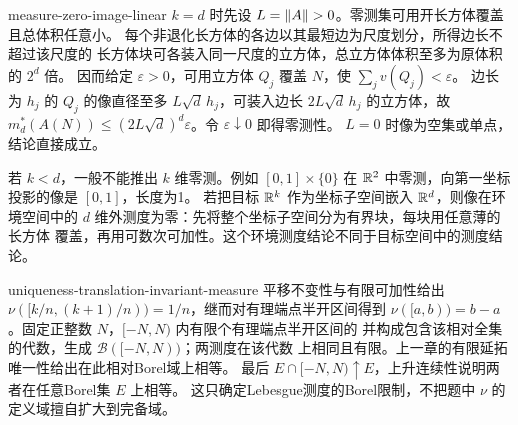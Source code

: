 \begin{solution}{measure-zero-image-linear}
$k=d$ 时先设 $L=\left\lVert A\right\rVert>0$。零测集可用开长方体覆盖且总体积任意小。
每个非退化长方体的各边以其最短边为尺度划分，所得边长不超过该尺度的
长方体块可各装入同一尺度的立方体，总立方体体积至多为原体积的 $2^d$ 倍。
因而给定 $\varepsilon>0$，可用立方体 $Q_j$ 覆盖 $N$，使
$\sum_jv(Q_j)<\varepsilon$。
边长为 $h_j$ 的 $Q_j$ 的像直径至多 $L\sqrt d\,h_j$，可装入边长
$2L\sqrt d\,h_j$ 的立方体，故
$m_d^*(A(N))\le(2L\sqrt d)^d\varepsilon$。令 $\varepsilon\downarrow0$ 即得零测性。
$L=0$ 时像为空集或单点，结论直接成立。

若 $k<d$，一般不能推出 $k$ 维零测。例如 $[0,1]\times\{0\}$ 在
$\mathbb{R}^2$ 中零测，向第一坐标投影的像是 $[0,1]$，长度为1。
若把目标 $\mathbb{R}^k$ 作为坐标子空间嵌入 $\mathbb{R}^d$，则像在环境空间中的
$d$ 维外测度为零：先将整个坐标子空间分为有界块，每块用任意薄的长方体
覆盖，再用可数次可加性。这个环境测度结论不同于目标空间中的测度结论。
\end{solution}

\begin{solution}{uniqueness-translation-invariant-measure}
平移不变性与有限可加性给出
$\nu([k/n,(k+1)/n))=1/n$，继而对有理端点半开区间得到
$\nu([a,b))=b-a$。固定正整数 $N$，$[-N,N)$ 内有限个有理端点半开区间的
并构成包含该相对全集的代数，生成 $\mathcal B([-N,N))$；两测度在该代数
上相同且有限。上一章的有限延拓唯一性给出在此相对Borel域上相等。
最后 $E\cap[-N,N)\uparrow E$，上升连续性说明两者在任意Borel集 $E$ 上相等。
这只确定Lebesgue测度的Borel限制，不把题中 $\nu$ 的定义域擅自扩大到完备域。
\end{solution}

